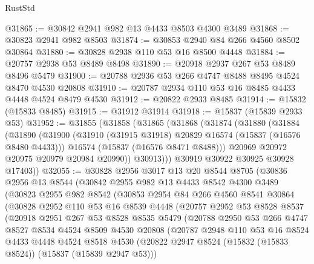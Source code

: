\begin{lexlean}{RustStd}
\begin{coremodule}
@31865 := @30842 @2941 @982 @13 @4433 @8503 @4300 @3489
@31868 := @30823 @2941 @982 @8503
@31874 := @30853 @2940 @84 @266 @4560 @8502 @30864
@31880 := @30828 @2938 @110 @53 @16 @8500 @4448
@31884 := @20757 @2938 @53 @8489 @8498
@31890 := @20918 @2937 @267 @53 @8489 @8496 @5479
@31900 := @20788 @2936 @53 @266 @4747 @8488 @8495 @4524 @8470 @4530 @20808
@31910 := @20787 @2934 @110 @53 @16 @8485 @4433 @4448 @4524 @8479 @4530
@31912 := @20822 @2933 @8485
@31914 := @15832 (@15833 @8485)
@31915 := @31912 @31914
@31918 := @15837 (@15839 @2933 @53)
@31952 := @31855
    (@31858
      (@31865
        (@31868
          (@31874
            (@31880
              (@31884
                (@31890
                  (@31900
                    (@31910 (@31915 @31918) @20829 @16574 (@15837 (@16576 @8480 @4433)))
                    @16574
                    (@15837 (@16576 @8471 @8488)))
                  @20969
                  @20972
                  @20975
                  @20979
                  @20984
                  @20990))
              @30913)))
        @30919
        @30922
        @30925
        @30928
        @17403))
@32055 := @30828
    @2956
    @3017
    @13
    @20
    @8544
    @8705
    (@30836
      @2956
      @13
      @8544
      (@30842
        @2955
        @982
        @13
        @4433
        @8542
        @4300
        @3489
        (@30823
          @2955
          @982
          @8542
          (@30853
            @2954
            @84
            @266
            @4560
            @8541
            @30864
            (@30828
              @2952
              @110
              @53
              @16
              @8539
              @4448
              (@20757
                @2952
                @53
                @8528
                @8537
                (@20918
                  @2951
                  @267
                  @53
                  @8528
                  @8535
                  @5479
                  (@20788
                    @2950
                    @53
                    @266
                    @4747
                    @8527
                    @8534
                    @4524
                    @8509
                    @4530
                    @20808
                    (@20787
                      @2948
                      @110
                      @53
                      @16
                      @8524
                      @4433
                      @4448
                      @4524
                      @8518
                      @4530
                      (@20822 @2947 @8524 (@15832 (@15833 @8524)) (@15837 (@15839 @2947 @53)))

\end{coremodule}
\end{lexlean}
